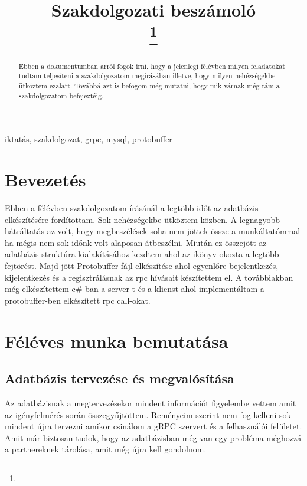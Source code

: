 \documentclass[conference]{IEEEtran}
\begin{document}
\title{Szakdolgozati beszámoló\\

\thanks{}
}

\author{
}

\maketitle

\begin{abstract}
Ebben a dokumentumban arról fogok írni, hogy a jelenlegi félévben milyen feladatokat tudtam teljesíteni a szakdolgozatom megírásában illetve, hogy milyen nehézségekbe ütköztem ezalatt. Továbbá azt is befogom még mutatni, hogy mik várnak még rám a szakdolgozatom befejeztéig. 
\end{abstract}

\begin{IEEEkeywords}
iktatás, szakdolgozat, grpc, mysql, protobuffer
\end{IEEEkeywords}

\section{Bevezetés}
Ebben a félévben szakdolgozatom írásánál a legtöbb időt az adatbázis elkészítésére fordítottam. Sok nehézségekbe ütköztem közben. A legnagyobb hátráltatás az volt, hogy megbeszélések soha nem jöttek össze a munkáltatómmal ha mégis nem sok időnk volt alaposan átbeszélni. Miután ez összejött az adatbázis struktúra kialakításához kezdtem ahol az ikönyv okozta a legtöbb fejtörést. Majd jött Protobuffer fájl elkészítése ahol egyenlőre bejelentkezés, kijelentkezés és a regisztrálásnak az rpc hívásait készítettem el. A továbbiakban még elkészítettem c\#-ban a server-t és a klienst ahol implementáltam a protobuffer-ben elkészített rpc call-okat.
\section{Féléves munka bemutatása}

\subsection{\textbf{Adatbázis tervezése és megvalósítása}}
Az adatbázisnak a megtervezésekor mindent információt figyelembe vettem amit az igényfelmérés során összegyűjtöttem. Reményeim szerint nem fog kelleni sok mindent újra tervezni amikor csinálom a gRPC szervert és a felhasználói felületet. Amit már biztosan tudok, hogy az adatbázisban még van egy probléma méghozzá a partnereknek tárolása, amit még újra kell gondolnom.
\\
\end{document}
